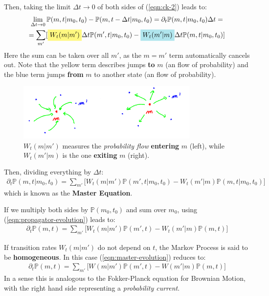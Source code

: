 \documentclass[../../main.tex]{subfiles}
\begin{document}
\medskip

Then, taking the limit $\Delta t \to 0$ of both sides of (\ref{eqn:ck-2}) leads to:
\begin{align*}
    \lim_{\Delta t \to 0} \mathbb{P}(m,t|m_0,t_0) - \mathbb{P}(m,t-\Delta t|m_0,t_0) = \partial_t \mathbb{P}(m,t|m_0,t_0) \Delta t = \span \\
    =\sum_{m'} [\hlc{Yellow}{W_t(m|m') }\Delta t \mathbb{P}(m',t|m_0,t_0) - \hlc{SkyBlue}{W_t(m'|m)} \Delta t \mathbb{P}(m,t|m_0,t_0)]  \span
\end{align*}
Here the sum can be taken over all $m'$, as the $m=m'$ term automatically cancels out. Note that the yellow term describes jumps \textbf{to}  $m$ (an  flow of probability) and the blue term jumps \textbf{from} $m$ to another state (an  flow of probability).

\begin{figure}[H]
    \centering
    \includegraphics[width=0.8\textwidth]{probability-flows.png}
    \caption{$W_t(m|m')$ measures the \textit{probability flow} \textbf{entering} $m$ (left), while $W_t(m'|m)$ is the one \textbf{exiting} $m$ (right).}
    \label{fig:probability-flows}
\end{figure}

Then, dividing everything by $\Delta t$:
\begin{align}\label{eqn:MasterEquation}
    \partial_t \mathbb{P}(m,t|m_0,t_0) = \sum_{m'} \Big[ W_t(m|m') \mathbb{P}(m',t|m_0,t_0) - W_t(m'|m) \mathbb{P}(m,t|m_0,t_0)\Big]
\end{align}
which is known as the \textbf{Master Equation}. 

If we multiply both sides by $\mathbb{P}(m_0,t_0)$ and sum over $m_0$, using (\ref{eqn:propagator-evolution}) leads to:
\begin{align}\label{eqn:master-evolution}
    \partial_t \mathbb{P}(m,t) = \sum_{m'} \Big[W_t(m|m') \mathbb{P}(m',t) - W_t(m'|m) \mathbb{P}(m,t) \Big]
\end{align}

If transition rates $W_t(m|m')$ do not depend on $t$, the Markov Process is said to be \textbf{homogeneous}. In this case (\ref{eqn:master-evolution}) reduces to:
\begin{align}\label{eqn:pdf-evolution}
    \partial_t \mathbb{P}(m,t) = \sum_{m'} \Big[W(m|m') \mathbb{P}(m',t) - W(m'|m)\mathbb{P}(m,t)\Big]
\end{align}
In a sense this is analogous to the Fokker-Planck equation for Brownian Motion, with the right hand side representing a \textit{probability current}. 
\end{document}
